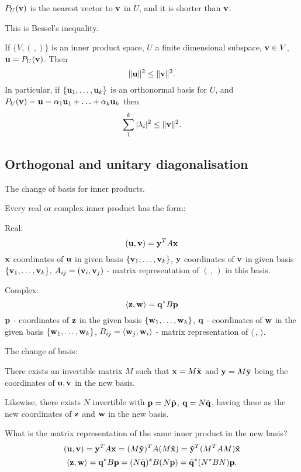 \documentclass[10pt, a4paper]{article}
\begin{document}
\begin{remark}
    $P_U(\mathbf{v})$ is the nearest vector to $\mathbf{v}$ in $U$,
    and it is shorter than $\mathbf{v}$.
\end{remark}
This is Bessel's inequality.

\begin{proposition}
    If $\{V, (\,,)\}$ is an inner product space,
    $U$ a finite dimensional subspace,
    $\mathbf{v} \in V$,
    $\mathbf{u} = P_U(\mathbf{v})$.
    Then
    \[
    \|\mathbf{u}\| ^ 2 \leq \|\mathbf{v}\| ^ 2.
    \]
    In particular,
    if $\{\mathbf{u}_1, \dotsc, \mathbf{u}_k\}$ is an orthonormal basis for $U$,
    and $P_U(\mathbf{v}) = \mathbf{u} = \alpha_1\mathbf{u}_1 + \dotsc + \alpha_k\mathbf{u}_k$ then
    \[
    \sum_{1}^{k}|\lambda_i| ^ 2 \leq \|\mathbf{v}\| ^ 2.
    \]
\end{proposition}

\subsection{Orthogonal and unitary diagonalisation}
The change of basis for inner products.

Every real or complex inner product has the form:

Real:
\[
(\mathbf{u}, \mathbf{v}) = \mathbf{y} ^ TA\mathbf{x}
\]
$\mathbf{x}$ coordinates of $\mathbf{u}$ in given basis $\{\mathbf{v}_1, \dotsc, \mathbf{v}_k\}$,
$\mathbf{y}$ coordinates of $\mathbf{v}$ in given basis $\{\mathbf{v}_1, \dotsc, \mathbf{v}_k\}$,
$A_{ij} = (\mathbf{v}_i, \mathbf{v}_j)$ - matrix representation of $(\,,\,)$ in this basis.

Complex:
\[
\langle\mathbf{z}, \mathbf{w}\rangle = \mathbf{q} ^ {*}B\mathbf{p}
\]
$\mathbf{p}$ - coordinates of $\mathbf{z}$ in the given basis $\{\mathbf{w}_1, \dotsc, \mathbf{w}_k\}$,
$\mathbf{q}$ - coordinates of $\mathbf{w}$ in the given basis $\{\mathbf{w}_1, \dotsc, \mathbf{w}_k\}$,
$B_{ij} = \langle\mathbf{w}_j, \mathbf{w}_i\rangle$ - matrix representation of $\langle\,,\,\rangle$.

The change of basis:

There exists an invertible matrix $M$ such that $\mathbf{x} = M\Tilde{\mathbf{x}}$ and $\mathbf{y} = M\Tilde{\mathbf{y}}$ being the coordinates of $\mathbf{u}, \mathbf{v}$ in the new basis.

Likewise,
there exists $N$ invertible with $\mathbf{p} = N\Tilde{\mathbf{p}}$,
$\mathbf{q} = N\Tilde{\mathbf{q}}$,
having these as the new coordinates of $\mathbf{z}$ and $\mathbf{w}$ in the new basis.

What is the matrix representation of the same inner product in the new basis?
\[
(\mathbf{u}, \mathbf{v}) = \mathbf{y} ^ TA\mathbf{x} = (M\Tilde{\mathbf{y}}) ^ TA(M\Tilde{\mathbf{x}}) = \Tilde{\mathbf{y}} ^ T(M ^ TAM)\Tilde{\mathbf{x}}
\]
\[
\langle\mathbf{z}, \mathbf{w}\rangle = \mathbf{q} ^ {*}B\mathbf{p} = (N\Tilde{\mathbf{q}}) ^ {*}B(N\mathbf{p}) = \Tilde{\mathbf{q}} ^ {*}(N ^ {*}BN)\mathbf{p}.
\]
\end{document}
